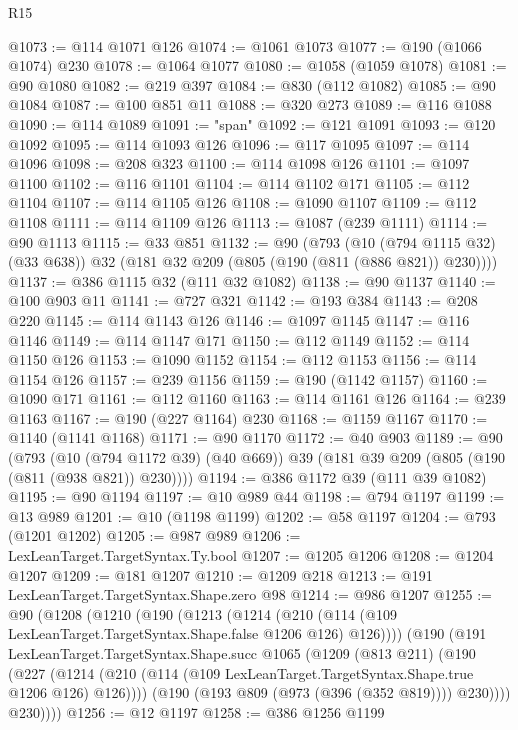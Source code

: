 \begin{lexlean}{R15}
\begin{coremodule}
@1073 := @114 @1071 @126
@1074 := @1061 @1073
@1077 := @190 (@1066 @1074) @230
@1078 := @1064 @1077
@1080 := @1058 (@1059 @1078)
@1081 := @90 @1080
@1082 := @219 @397
@1084 := @830 (@112 @1082)
@1085 := @90 @1084
@1087 := @100 @851 @11
@1088 := @320 @273
@1089 := @116 @1088
@1090 := @114 @1089
@1091 := "span"
@1092 := @121 @1091
@1093 := @120 @1092
@1095 := @114 @1093 @126
@1096 := @117 @1095
@1097 := @114 @1096
@1098 := @208 @323
@1100 := @114 @1098 @126
@1101 := @1097 @1100
@1102 := @116 @1101
@1104 := @114 @1102 @171
@1105 := @112 @1104
@1107 := @114 @1105 @126
@1108 := @1090 @1107
@1109 := @112 @1108
@1111 := @114 @1109 @126
@1113 := @1087 (@239 @1111)
@1114 := @90 @1113
@1115 := @33 @851
@1132 := @90
    (@793
      (@10 (@794 @1115 @32) (@33 @638))
      @32
      (@181 @32 @209 (@805 (@190 (@811 (@886 @821)) @230))))
@1137 := @386 @1115 @32 (@111 @32 @1082)
@1138 := @90 @1137
@1140 := @100 @903 @11
@1141 := @727 @321
@1142 := @193 @384
@1143 := @208 @220
@1145 := @114 @1143 @126
@1146 := @1097 @1145
@1147 := @116 @1146
@1149 := @114 @1147 @171
@1150 := @112 @1149
@1152 := @114 @1150 @126
@1153 := @1090 @1152
@1154 := @112 @1153
@1156 := @114 @1154 @126
@1157 := @239 @1156
@1159 := @190 (@1142 @1157)
@1160 := @1090 @171
@1161 := @112 @1160
@1163 := @114 @1161 @126
@1164 := @239 @1163
@1167 := @190 (@227 @1164) @230
@1168 := @1159 @1167
@1170 := @1140 (@1141 @1168)
@1171 := @90 @1170
@1172 := @40 @903
@1189 := @90
    (@793
      (@10 (@794 @1172 @39) (@40 @669))
      @39
      (@181 @39 @209 (@805 (@190 (@811 (@938 @821)) @230))))
@1194 := @386 @1172 @39 (@111 @39 @1082)
@1195 := @90 @1194
@1197 := @10 @989 @44
@1198 := @794 @1197
@1199 := @13 @989
@1201 := @10 (@1198 @1199)
@1202 := @58 @1197
@1204 := @793 (@1201 @1202)
@1205 := @987 @989
@1206 := LexLeanTarget.TargetSyntax.Ty.bool
@1207 := @1205 @1206
@1208 := @1204 @1207
@1209 := @181 @1207
@1210 := @1209 @218
@1213 := @191 LexLeanTarget.TargetSyntax.Shape.zero @98
@1214 := @986 @1207
@1255 := @90
    (@1208
      (@1210
        (@190
          (@1213
            (@1214 (@210 (@114 (@109 LexLeanTarget.TargetSyntax.Shape.false @1206 @126) @126))))
          (@190
            (@191
              LexLeanTarget.TargetSyntax.Shape.succ
              @1065
              (@1209
                (@813 @211)
                (@190
                  (@227
                    (@1214
                      (@210 (@114 (@109 LexLeanTarget.TargetSyntax.Shape.true @1206 @126) @126))))
                  (@190 (@193 @809 (@973 (@396 (@352 @819)))) @230))))
            @230))))
@1256 := @12 @1197
@1258 := @386 @1256 @1199

\end{coremodule}
\end{lexlean}
